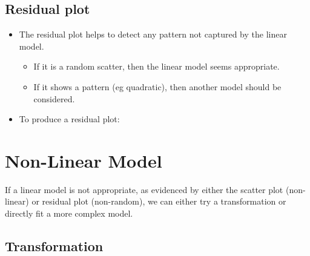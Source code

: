 \documentclass[]{article}
\newenvironment{Shaded}{\begin{snugshade}}{\end{snugshade}}
\newcommand{\CommentTok}[1]{\textcolor[rgb]{0.56,0.35,0.01}{\textit{#1}}}
\newcommand{\DataTypeTok}[1]{\textcolor[rgb]{0.13,0.29,0.53}{#1}}
\newcommand{\DecValTok}[1]{\textcolor[rgb]{0.00,0.00,0.81}{#1}}
\newcommand{\KeywordTok}[1]{\textcolor[rgb]{0.13,0.29,0.53}{\textbf{#1}}}
\newcommand{\NormalTok}[1]{#1}
\newcommand{\OperatorTok}[1]{\textcolor[rgb]{0.81,0.36,0.00}{\textbf{#1}}}
\newcommand{\StringTok}[1]{\textcolor[rgb]{0.31,0.60,0.02}{#1}}
\providecommand{\tightlist}{%
  \setlength{\itemsep}{0pt}\setlength{\parskip}{0pt}}
\begin{document}
\hypertarget{residual-plot}{%
\subsection{Residual plot}\label{residual-plot}}

\begin{itemize}
\item
  The residual plot helps to detect any pattern not captured by the linear model.

  \begin{itemize}
  \tightlist
  \item
    If it is a random scatter, then the linear model seems appropriate.
  \item
    If it shows a pattern (eg quadratic), then another model should be considered.
  \end{itemize}
\item
  To produce a residual plot:
\end{itemize}

\begin{Shaded}
\end{Shaded}

\hypertarget{nonlinearmodel}{%
\section{Non-Linear Model}\label{nonlinearmodel}}

If a linear model is not appropriate, as evidenced by either the scatter plot (non-linear) or residual plot (non-random), we can either try a transformation or directly fit a more complex model.

\hypertarget{transformation}{%
\subsection{Transformation}\label{transformation}}

\begin{Shaded}
\end{Shaded}
\end{document}
